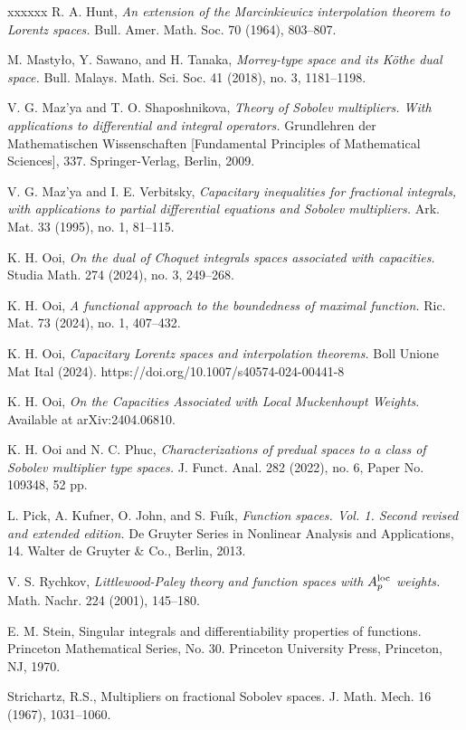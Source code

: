 \documentclass[10pt,reqno]{amsart}
\numberwithin{equation}{section}
\begin{document}
\begin{thebibliography}{xxxxxx}
 R. A. Hunt, {\it An extension of the Marcinkiewicz interpolation theorem to Lorentz spaces.} Bull. Amer. Math. Soc. 70 (1964), 803–807.

 M. Masty\l o, Y. Sawano, and H. Tanaka, {\it Morrey-type space and its K\"othe dual space.} Bull. Malays. Math. Sci. Soc. 41 (2018), no. 3, 1181–1198.

 V. G. Maz'ya and T. O. Shaposhnikova, {\it Theory of Sobolev multipliers. With applications to differential and integral operators.} Grundlehren der Mathematischen Wissenschaften [Fundamental Principles of Mathematical Sciences], 337. Springer-Verlag, Berlin, 2009.

 V. G. Maz'ya and I. E. Verbitsky, {\it Capacitary inequalities for fractional integrals, with applications to partial differential equations and Sobolev multipliers.} Ark. Mat. 33 (1995), no. 1, 81–115.

 K. H. Ooi, {\it On the dual of Choquet integrals spaces associated with capacities.} Studia Math. 274 (2024), no. 3, 249–268.

 K. H. Ooi, {\it A functional approach to the boundedness of maximal function.} Ric. Mat. 73 (2024), no. 1, 407–432.

 K. H. Ooi, {\it Capacitary Lorentz spaces and interpolation theorems.} Boll Unione Mat Ital (2024). https://doi.org/10.1007/s40574-024-00441-8

 K. H. Ooi, {\it On the Capacities Associated with Local Muckenhoupt Weights}. Available at arXiv:2404.06810.

 K. H. Ooi and N. C. Phuc, {\it Characterizations of predual spaces to a class of Sobolev multiplier type spaces.} J. Funct. Anal. 282 (2022), no. 6, Paper No. 109348, 52 pp.

 L. Pick, A. Kufner, O. John, and S. Fu\'ik, {\it Function spaces. Vol. 1. Second revised and extended edition.} De Gruyter Series in Nonlinear Analysis and Applications, 14. Walter de Gruyter \& Co., Berlin, 2013.

 V. S. Rychkov, {\it Littlewood-Paley theory and function spaces with $A_{p}^{\rm loc}$ weights.} Math. Nachr. 224 (2001), 145–180.

 E. M. Stein, Singular integrals and differentiability properties of functions. Princeton Mathematical Series, No. 30. Princeton University Press, Princeton, NJ, 1970.

 Strichartz, R.S., Multipliers on fractional Sobolev spaces. J. Math. Mech. 16 (1967), 1031–1060.
\end{thebibliography}

\end{document}
